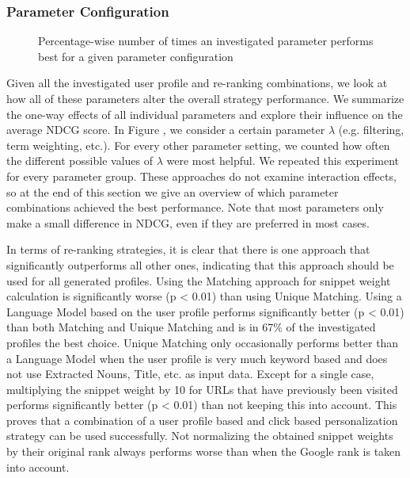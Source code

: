 \documentclass{sig-alternate}
\begin{document}
\subsubsection{Parameter Configuration}

\begin{figure*}
\centering
{}
\caption{Percentage-wise number of times an investigated parameter performs best for a given parameter configuration}
\label{fig:perparam}
\end{figure*}

Given all the investigated user profile and re-ranking combinations, we look at how all of these parameters alter the overall strategy performance. We summarize the one-way effects of all individual parameters and explore their influence on the average NDCG score. In Figure \label{fig:perparam}, we consider a certain parameter $\lambda$ (e.g. filtering, term weighting, etc.). For every other parameter setting, we counted how often the different possible values of $\lambda$  were most helpful. We repeated this experiment for every parameter group. These approaches do not examine interaction effects, so at the end of this section we give an overview of which parameter combinations achieved the best performance. Note that most parameters only make a small difference in NDCG, even if they are preferred in most cases.

In terms of re-ranking strategies, it is clear that there is one approach that significantly outperforms all other ones, indicating that this approach should be used for all generated profiles. Using the Matching approach for snippet weight calculation is significantly worse (p < 0.01) than using Unique Matching. Using a Language Model based on the user profile performs significantly better (p < 0.01) than both Matching and Unique Matching and is in 67\% of the investigated profiles the best choice. Unique Matching only occasionally performs better than a Language Model when the user profile is very much keyword based and does not use Extracted Nouns, Title, etc. as input data. Except for a single case, multiplying the snippet weight by 10 for URLs that have previously been visited performs significantly better (p < 0.01) than not keeping this into account. This proves that a combination of a user profile based and click based personalization strategy can be used successfully. Not normalizing the obtained snippet weights by their original rank always performs worse than when the Google rank is taken into account.
\end{document}
